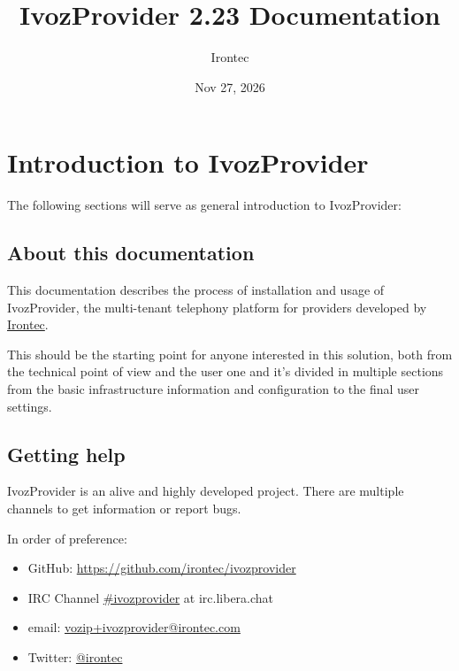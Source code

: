 \documentclass[letterpaper,10pt,english]{sphinxmanual}
\title{IvozProvider 2.23 Documentation}
\date{Nov 27, 2026}
\author{Irontec}
\begin{document}
\maketitle
\tableofcontents
{}\label{index::doc}



\chapter{Introduction to IvozProvider}
\label{basic_concepts/intro/index::doc}\label{basic_concepts/intro/index:introduction-to-ivozprovider}\label{basic_concepts/intro/index:ivozprovider-official-documentation}
The following sections will serve as general introduction to IvozProvider:


\section{About this documentation}
\label{basic_concepts/intro/about::doc}\label{basic_concepts/intro/about:about-this-documentation}
This documentation describes the process of installation and usage of
IvozProvider, the multi-tenant telephony platform for providers developed
by \href{http://irontec.com}{Irontec}.

This should be the starting point for anyone interested in this solution,
both from the technical point of view and the user one and it's divided
in multiple sections from the basic infrastructure information and configuration
to the final user settings.


\section{Getting help}
\label{basic_concepts/intro/getting_help:getting-help}\label{basic_concepts/intro/getting_help::doc}\label{basic_concepts/intro/getting_help:id1}
IvozProvider is an alive and highly developed project. There are
multiple channels to get information or report bugs.

In order of preference:
\begin{itemize}
\item {} 
GitHub: \url{https://github.com/irontec/ivozprovider}

\item {} 
IRC Channel \href{https://kiwiirc.com/nextclient/irc.libera.chat/\#ivozprovider}{\#ivozprovider} at irc.libera.chat

\item {} 
email: \href{mailto:vozip+ivozprovider@irontec.com}{vozip+ivozprovider@irontec.com}

\item {} 
Twitter: \href{https://twitter.com/irontec}{@irontec}

\end{itemize}
\end{document}
